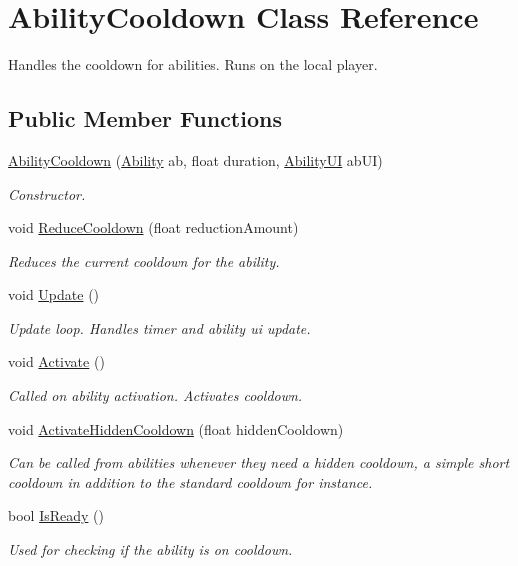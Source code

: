 \hypertarget{class_ability_cooldown}{}\section{Ability\+Cooldown Class Reference}
\label{class_ability_cooldown}


Handles the cooldown for abilities. Runs on the local player.  


\subsection*{Public Member Functions}
\begin{DoxyCompactItemize}
\item 
\hyperlink{class_ability_cooldown_a1ca2a7d717770a00d713f60c98213511}{Ability\+Cooldown} (\hyperlink{class_ability}{Ability} ab, float duration, \hyperlink{class_ability_u_i}{Ability\+UI} ab\+UI)
\begin{DoxyCompactList}\small\item\em Constructor. \end{DoxyCompactList}\item 
void \hyperlink{class_ability_cooldown_abba8f163068aa6d9029a4138cacdacde}{Reduce\+Cooldown} (float reduction\+Amount)
\begin{DoxyCompactList}\small\item\em Reduces the current cooldown for the ability. \end{DoxyCompactList}\item 
void \hyperlink{class_ability_cooldown_a0a1223f783a3c342413172a5797fa597}{Update} ()
\begin{DoxyCompactList}\small\item\em Update loop. Handles timer and ability ui update. \end{DoxyCompactList}\item 
void \hyperlink{class_ability_cooldown_acd67a3f56a47bc9c226a359d24a276eb}{Activate} ()
\begin{DoxyCompactList}\small\item\em Called on ability activation. Activates cooldown. \end{DoxyCompactList}\item 
void \hyperlink{class_ability_cooldown_a7423fa48fe64540ee2d08b16154673c0}{Activate\+Hidden\+Cooldown} (float hidden\+Cooldown)
\begin{DoxyCompactList}\small\item\em Can be called from abilities whenever they need a hidden cooldown, a simple short cooldown in addition to the standard cooldown for instance. \end{DoxyCompactList}\item 
bool \hyperlink{class_ability_cooldown_a873d580a5eff83aaa450b8ffbd388f6d}{Is\+Ready} ()
\begin{DoxyCompactList}\small\item\em Used for checking if the ability is on cooldown. \end{DoxyCompactList}\end{DoxyCompactItemize}


